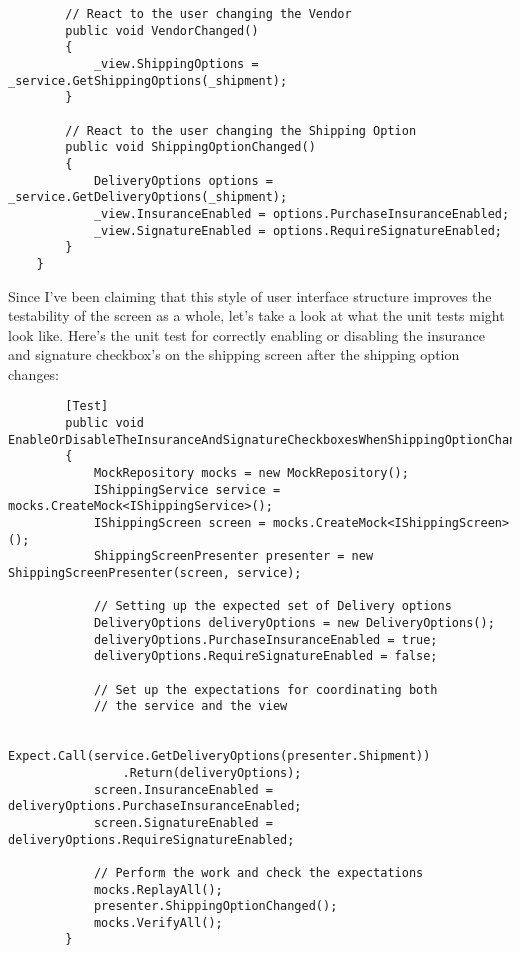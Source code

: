 \documentclass{article}
\begin{document}
{\begin{lstlisting}
        // React to the user changing the Vendor
        public void VendorChanged()
        {
            _view.ShippingOptions = _service.GetShippingOptions(_shipment);
        } 

        // React to the user changing the Shipping Option
        public void ShippingOptionChanged()
        {
            DeliveryOptions options = _service.GetDeliveryOptions(_shipment);
            _view.InsuranceEnabled = options.PurchaseInsuranceEnabled;
            _view.SignatureEnabled = options.RequireSignatureEnabled;
        }
    }
\end{lstlisting}	

Since I've been claiming that this style of user interface structure improves the testability of the screen as a whole, let's take a look at what the unit tests might look like.  Here's the unit test for correctly enabling or disabling the insurance and signature checkbox's on the shipping screen after the shipping option changes:

 \newpage
\begin{lstlisting}
        [Test]
        public void EnableOrDisableTheInsuranceAndSignatureCheckboxesWhenShippingOptionChanges()
        {
            MockRepository mocks = new MockRepository();
            IShippingService service = mocks.CreateMock<IShippingService>();
            IShippingScreen screen = mocks.CreateMock<IShippingScreen>();
            ShippingScreenPresenter presenter = new ShippingScreenPresenter(screen, service); 

            // Setting up the expected set of Delivery options
            DeliveryOptions deliveryOptions = new DeliveryOptions();
            deliveryOptions.PurchaseInsuranceEnabled = true;
            deliveryOptions.RequireSignatureEnabled = false; 

            // Set up the expectations for coordinating both
            // the service and the view

            Expect.Call(service.GetDeliveryOptions(presenter.Shipment))
                .Return(deliveryOptions);
            screen.InsuranceEnabled = deliveryOptions.PurchaseInsuranceEnabled;
            screen.SignatureEnabled = deliveryOptions.RequireSignatureEnabled;
			
            // Perform the work and check the expectations
            mocks.ReplayAll();
            presenter.ShippingOptionChanged();
            mocks.VerifyAll();
        }
\end{lstlisting}		

}
\end{document}

